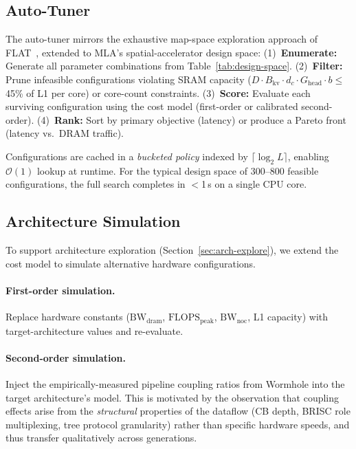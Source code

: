 \documentclass[sigconf, review, anonymous]{acmart}
\newcommand{\autoTuner}{auto-tuner}
\newcommand{\AutoTuner}{Auto-Tuner}
\newcommand{\Bkv}{B_{\mathrm{kv}}}
\newcommand{\Ghead}{G_{\mathrm{head}}}
\begin{document}

\subsection{\AutoTuner}\label{sec:cm-tuner}


The \autoTuner{} mirrors the exhaustive map-space exploration approach
of FLAT~\cite{kao2023flat}, extended to MLA's spatial-accelerator
design space:
(1)~\textbf{Enumerate:} Generate all parameter combinations from
Table~\ref{tab:design-space}.
(2)~\textbf{Filter:} Prune infeasible configurations violating
SRAM capacity ($D \cdot \Bkv \cdot d_c \cdot \Ghead \cdot b \leq$
45\% of L1 per core) or core-count constraints.
(3)~\textbf{Score:} Evaluate each surviving configuration using the
cost model (first-order or calibrated second-order).
(4)~\textbf{Rank:} Sort by primary objective (latency) or produce
a Pareto front (latency vs.\ DRAM traffic).

Configurations are cached in a \emph{bucketed policy} indexed by
$\lceil \log_2 L \rceil$, enabling $\mathcal{O}(1)$ lookup at runtime.
For the typical design space of 300--800 feasible configurations,
the full search completes in $<$1\,s on a single CPU core.



\subsection{Architecture Simulation}\label{sec:cm-archsim}

To support architecture exploration (Section~\ref{sec:arch-explore}),
we extend the cost model to simulate alternative hardware configurations.

\paragraph{First-order simulation.}
Replace hardware constants ($\mathrm{BW}_{\mathrm{dram}}$,
$\mathrm{FLOPS}_{\mathrm{peak}}$, $\mathrm{BW}_{\mathrm{noc}}$,
L1 capacity) with target-architecture values and re-evaluate.

\paragraph{Second-order simulation.}
Inject the empirically-measured pipeline coupling ratios from
Wormhole into the target architecture's model.
This is motivated by the observation that coupling effects arise from
the \emph{structural} properties of the dataflow (CB depth, BRISC role
multiplexing, tree protocol granularity) rather than specific hardware
speeds, and thus transfer qualitatively across generations.
\end{document}
